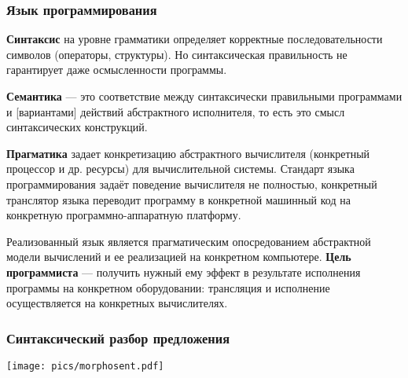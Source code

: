 \documentclass[10pt]{beamer}
\begin{document}
\begin{frame}
  \frametitle{Язык программирования}
\textbf{Синтаксис} на уровне грамматики определяет корректные последовательности символов (операторы, структуры). Но синтаксическая правильность не гарантирует даже осмысленности программы. %

\textbf{Семантика} — это соответствие между синтаксически правильными программами и [вариантами] действий абстрактного исполнителя, то есть это смысл синтаксических конструкций.

\textbf{Прагматика} задает конкретизацию абстрактного вычислителя (конкретный процессор и др. ресурсы) для  вычислительной системы. Стандарт языка программирования задаёт поведение вычислителя не полностью, конкретный транслятор языка переводит программу в конкретной машинный код на конкретную программно-аппаратную платформу.

Реализованный язык является прагматическим опосредованием абстрактной модели вычислений и ее реализацией на конкретном компьютере.
\vfill
\textbf{Цель программиста} — получить нужный ему эффект в результате исполнения программы на конкретном оборудовании: трансляция и исполнение осуществляется на конкретных вычислителях.

\end{frame}

\begin{frame}
  \frametitle{Синтаксический разбор предложения}
  \begin{center}
    \texttt{[image: pics/morphosent.pdf]}
  \end{center}
\end{frame}
\end{document}
